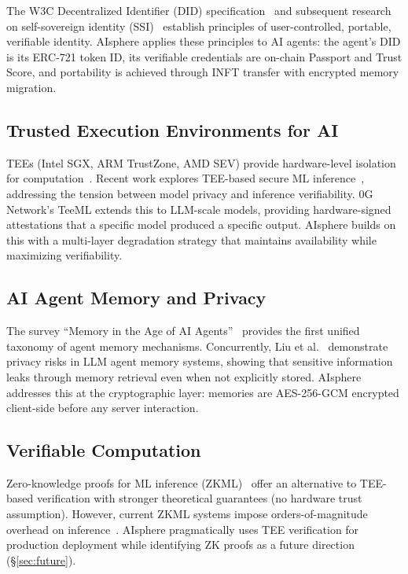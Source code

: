 \documentclass[10pt,a4paper]{article}
\theoremstyle{definition}
\theoremstyle{plain}
\begin{document}
The W3C Decentralized Identifier (DID) specification~\cite{w3c-did2022} and subsequent research on self-sovereign identity (SSI)~\cite{ssi-survey2024, ssi-blockchain2024} establish principles of user-controlled, portable, verifiable identity. AIsphere applies these principles to AI agents: the agent's DID is its ERC-721 token ID, its verifiable credentials are on-chain Passport and Trust Score, and portability is achieved through INFT transfer with encrypted memory migration.

\subsection{Trusted Execution Environments for AI}

TEEs (Intel SGX, ARM TrustZone, AMD SEV) provide hardware-level isolation for computation~\cite{tee-survey2025}. Recent work explores TEE-based secure ML inference~\cite{tee-ai-survey2024, secureinfer2025}, addressing the tension between model privacy and inference verifiability. 0G Network's TeeML extends this to LLM-scale models, providing hardware-signed attestations that a specific model produced a specific output. AIsphere builds on this with a multi-layer degradation strategy that maintains availability while maximizing verifiability.

\subsection{AI Agent Memory and Privacy}

The survey ``Memory in the Age of AI Agents''~\cite{memory-survey2025} provides the first unified taxonomy of agent memory mechanisms. Concurrently, Liu et al.~\cite{memory-privacy2025} demonstrate privacy risks in LLM agent memory systems, showing that sensitive information leaks through memory retrieval even when not explicitly stored. AIsphere addresses this at the cryptographic layer: memories are AES-256-GCM encrypted client-side before any server interaction.

\subsection{Verifiable Computation}

Zero-knowledge proofs for ML inference (ZKML)~\cite{zkml2024} offer an alternative to TEE-based verification with stronger theoretical guarantees (no hardware trust assumption). However, current ZKML systems impose orders-of-magnitude overhead on inference~\cite{zkml-survey2025}. AIsphere pragmatically uses TEE verification for production deployment while identifying ZK proofs as a future direction (\S\ref{sec:future}).
\end{document}

